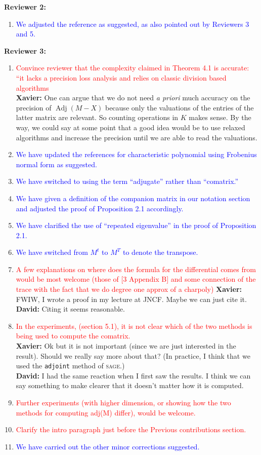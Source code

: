 \documentclass{sig-alternate-05-2015}
\DeclareMathOperator{\adj}{Adj}
\newcommand{\done}[1]{\textcolor{blue}{#1}}
\newcommand{\tdo}[1]{\textcolor{red}{#1}}
\newcommand{\xavier}[1]{\textcolor{answer}{{\bf Xavier:} #1}}
\newcommand{\david}[1]{\textcolor{answer}{{\bf David:} #1}}
\begin{document}
\textbf{Reviewer 2:}
\begin{enumerate}
\item \done{We adjusted the reference as suggested, as also pointed out by Reviewers 3 and 5.}
\end{enumerate}
\textbf{Reviewer 3:}
\begin{enumerate}
\item \tdo{Convince reviewer that the complexity claimed in Theorem 4.1 is accurate: ``it lacks a precision loss analysis and relies on classic division based algorithms}\\
      \xavier{One can argue that we do not need \emph{a priori} much accuracy on the precision of $\adj(M-X)$ because only the valuations of the entries of the latter matrix are relevant. So counting operations in $K$ makes sense. By the way, we could say at some point that a good idea would be to use relaxed algorithms and increase the precision until we are able to read the valuations.}
\item \done{We have updated the references for characteristic polynomial using Frobenius normal form as suggested.}
\item \done{We have switched to using the term ``adjugate'' rather than ``comatrix.''}
\item \done{We have given a definition of the companion matrix in our notation section and adjusted the proof of Proposition 2.1 accordingly.}
\item \done{We have clarified the use of ``repeated eigenvalue'' in the proof of Proposition 2.1.}
\item \done{We have switched from $M^t$ to $M^T$ to denote the transpose.}
\item \tdo{A few explanations on where does the formula for the differential comes from
would be most welcome (those of [3 Appendix B] and some connection of the trace
with the fact that we do degree one approx of a charpoly)}
      \xavier{FWIW, I wrote a proof in my lecture at JNCF. Maybe we can just cite it.}\\
      \david{Citing it seems reasonable.}
\item \tdo{In the experiments, (section 5.1), it is not clear which of the two methods is being used to compute the comatrix.}\\
      \xavier{Ok but it is not important (since we are just interested in the result). Should we really say more about that? (In practice, I think that we used the \texttt{adjoint} method of \textsc{sage}.)}\\
      \david{I had the same reaction when I first saw the results.  I think we can say something to make clearer that it doesn't matter how it is computed.}
\item \tdo{Further experiments (with higher dimension, or showing how the two methods for computing adj(M) differ), would be welcome.}
\item \tdo{Clarify the intro paragraph just before the Previous contributions section.}
\item \done{We have carried out the other minor corrections suggested.}
\end{enumerate}
\end{document}
